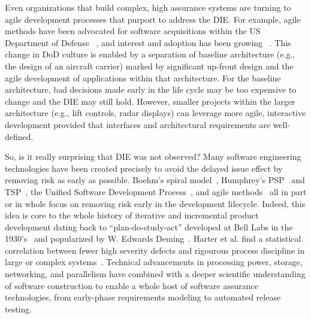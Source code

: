 \documentclass[smallcondensed]{svjour3}
\begin{document}

Even organizations that build complex, high assurance systems are turning to agile development processes that purport to address the DIE. For example, agile methods have been advocated for software acquisitions within the US Department of Defense ~\cite{kim13}, and interest and adoption has been growing ~\cite{lapham11}. 
This change in DoD culture is enabled by a separation of baseline architecture
(e.g., the design of an 
aircraft carrier) marked by significant up-front design and the agile development of applications within that architecture.
For the baseline architecture, bad decisions
made early in the life cycle may be too expensive to change and the DIE may still hold.
However, smaller projects within the larger architecture (e.g., lift controls, radar displays) can leverage more agile, interactive development provided that interfaces and architectural requirements are well-defined. 
 
So, is it really surprising that DIE was not observed? Many software engineering technologies have been created precisely to avoid the delayed issue effect by removing risk as early as possible. Boehm's spiral model~\cite{boehm1988spiral}, Humphrey's PSP~\cite{humphrey1995discipline} and TSP~\cite{tsp00}, the Unified Software Development Process~\cite{jacobson1999unified}, and agile methods~\cite{Beck2001a} all in part or in whole focus on removing risk early in the development lifecycle. Indeed, this idea is core to the whole history of iterative and incremental product development dating back to ``plan-do-study-act'' developed at Bell Labs in the 1930's~\cite{larman2003iterative} and popularized by W. Edwards Deming~\cite{deming1986out}. Harter et al. find a statistical correlation between fewer high severity defects and rigourous process discipline in large or complex systems~\cite{harter2012does}. Technical advancements in processing power, storage, networking, and parallelism have combined with a deeper scientific understanding of software construction to enable a whole host of software assurance technologies, from early-phase requirements modeling to automated release testing.
\end{document}
